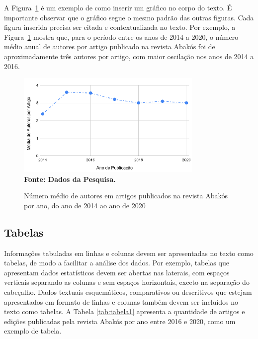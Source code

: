 \documentclass[a4paper,12pt]{article}
\begin{document}
A Figura~\ref{fig:figura3} é um exemplo de como inserir um gráfico no corpo do texto. É importante observar que o gráfico segue o mesmo padrão das outras figuras. Cada figura inserida precisa ser citada e contextualizada no texto. Por exemplo, a Figura~\ref{fig:figura3} mostra que, para o período entre os anos de 2014 a 2020, o número médio anual de autores por artigo publicado na revista Abakós foi de aproximadamente três autores por artigo, com maior oscilação nos anos de 2014 a 2016.

\begin{figure}[ht]
	\centering	
	\caption[Média de Autores por Artigo.]{Número médio de autores em artigos publicados na revista Abakós por ano, do ano de 2014 ao ano de 2020}
	\label{fig:figura3}
	\includegraphics[width=0.8\textwidth]{figuras/AutoresPorArtigoNaRevistaAbakos.png}\\
	\textbf{\footnotesize Fonte: Dados da Pesquisa.}
\end{figure}



\subsection{Tabelas}

Informações tabuladas em linhas e colunas devem ser apresentadas no texto como tabelas, de modo a facilitar a análise dos dados. Por exemplo, tabelas que apresentam dados estatísticos devem ser abertas nas laterais, com espaços verticais separando as colunas e sem espaços horizontais, exceto na separação do cabeçalho. Dados textuais esquemáticos, comparativos ou descritivos que estejam apresentados em formato de linhas e colunas também devem ser incluídos no texto como tabelas. A Tabela \ref{tab:tabela1} apresenta a quantidade de artigos e edições publicadas pela revista Abakós por ano entre 2016 e 2020, como um exemplo de tabela.
\end{document}
